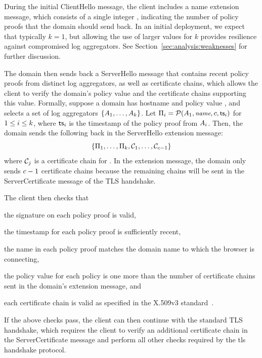 During the initial
  ClientHello message, the client includes a \ac{name} extension message, which
  consists of a single integer \numlas, indicating the number of policy proofs
  that the domain should send back.
In an initial deployment, we expect that typically $k=1$, but allowing the use
of larger values for $k$ provides resilience against compromised log
aggregators.  See Section~\ref{sec:analysis:weaknesses} for further discussion.

The domain then sends back a ServerHello message that contains \numlas recent
policy proofs from \numlas distinct log aggregators, as well as \numlas
certificate chains, which allows the client to verify the domain's policy value
and the certificate chains supporting this value. Formally, suppose a domain has
hostname \hostname and policy value \policy, and selects a set of log
aggregators $\{A_1, \ldots, A_k\}$. Let $\Pi_i =
\mathcal{P}(A_1, \small{\emph{name}}, c, \textsf{ts}_i)$ for $1 \le i \le
k$, where $\textsf{ts}_i$ is the timestamp of the policy proof from
$A_i$. Then, the domain sends the following back in the ServerHello
extension message:
\begin{equation}
  \{\Pi_1, \ldots, \Pi_k, \mathcal{C}_1,
  \ldots, \mathcal{C}_{c - 1}\}
\end{equation}
where $\mathcal{C}_j$ is a certificate chain for \hostname. In the extension
message, the domain only sends $c - 1$ certificate chains because the
remaining chains will be sent in the ServerCertificate message of the TLS
handshake.

The client then checks that
\begin{inparaenum}
\item the signature on each policy proof is valid,
\item the timestamp for each policy proof is sufficiently recent,
\item the name in each policy proof matches the domain name to which 
      the browser is connecting,
\item the policy value for each policy is one more than the number of
  certificate chains sent in the domain's extension message, and
\item each certificate chain is valid as specified in the X.509v3
  standard~\cite{rfc5280}.
\end{inparaenum}
If the above checks pass, the client can then continue with the standard TLS
handshake, which requires the client to verify an additional certificate chain
in the ServerCertificate message and perform all other checks required by the
\ac{tls} handshake protocol.

